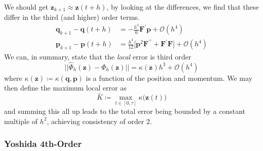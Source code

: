       We should get $\mathbf{z}_{k+1} \approx \mathbf{z}(t + h)$, by looking at the differences, we find that these differ in the third (and higher) order terms. 
      \begin{align*}
        \mathbf{q}_{k+1} - \mathbf{q}(t + h) & = - \frac{h^3}{6} \mathbf{F}^\prime \mathbf{p} + \mathcal{O}(h^4) \\
        \mathbf{p}_{k+1} - \mathbf{p}(t + h) & = \frac{h^3}{12} \big[ \mathbf{p}^2 \mathbf{F}^{\prime\prime} + \mathbf{F}^\prime \mathbf{F} \big] + \mathcal{O}(h^4)
      \end{align*}
      We can, in summary, state that the \textit{local} error is third order
      \begin{equation}
        ||\hat{\Phi}_h (\mathbf{z}) - \Phi_h (\mathbf{z})|| = \kappa(\mathbf{z}) h^3 + \mathcal{O}(h^4)
      \end{equation}
      where $\kappa(\mathbf{z}) \coloneqq \kappa(\mathbf{q}, \mathbf{p})$ is a function of the position and momentum. We may then define the maximum local error as 
      \begin{equation}
        \bar{K} \coloneqq \max_{t \in [0, \tau]} \kappa \big(\mathbf{z}(t)\big)
      \end{equation}
      and summing this all up leads to the total error being bounded by a constant multiple of $h^2$, achieving consistency of order 2. 

    \subsubsection{Yoshida 4th-Order}

